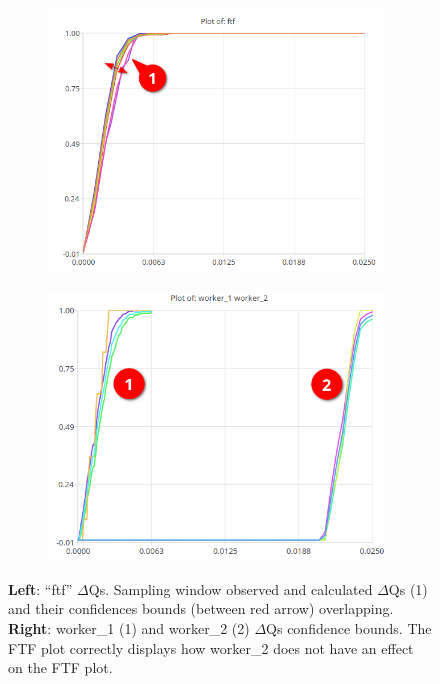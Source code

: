             \begin{figure}[H]
                \centering 
                \begin{subfigure}{.5\textwidth}
                    \centering
                    \includegraphics[width =0.98\textwidth]{img/ftfa.png}
                    \label{fig:ftf_art_d}
                \end{subfigure}%
                \begin{subfigure}{.5\textwidth}%
                    \centering%
                    \includegraphics[width =0.98\textwidth]{img/delay32.png}%
                    \label{fig:ftf_art_dw}%
                \end{subfigure}%
                \caption{\textbf{Left}: ``ftf'' $\Delta$Qs. Sampling window observed and calculated $\Delta$Qs (1) and their confidences bounds (between red arrow) overlapping.
                \textbf{Right}: worker\_1 (1) and worker\_2 (2) $\Delta$Qs confidence bounds.
                The FTF plot correctly displays how worker\_2 does not have an effect on the FTF plot.}
                \label{fig:ftf_w1w2}%
            \end{figure}%

